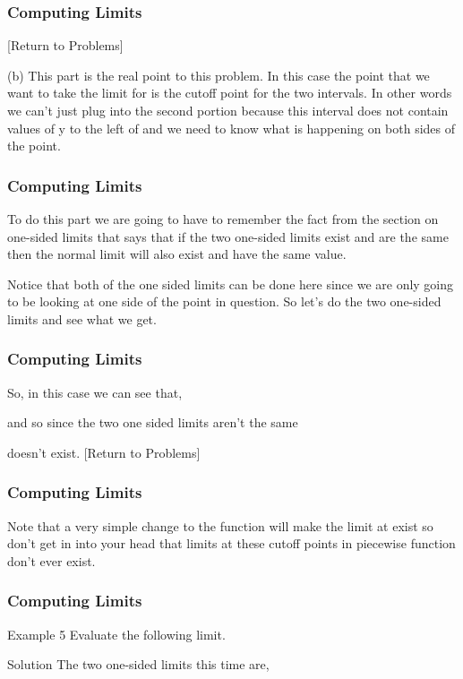 \documentclass{beamer}
\begin{document}
\begin{frame}[fragile]
	\frametitle{Computing Limits}
	\Large
[Return to Problems]

(b)  
This part is the real point to this problem.  In this case the point that we want to take the limit for is the cutoff point for the two intervals.  In other words we can’t just plug  into the second portion because this interval does not contain values of y to the left of  and we need to know what is happening on both sides of the point.
\end{frame}
\begin{frame}[fragile]
	\frametitle{Computing Limits}
	\Large
To do this part we are going to have to remember the fact from the section on one-sided limits that says that if the two one-sided limits exist and are the same then the normal limit will also exist and have the same value.

Notice that both of the one sided limits can be done here since we are only going to be looking at one side of the point in question.  So let’s do the two one-sided limits and see what we get.
\end{frame}
\begin{frame}[fragile]
	\frametitle{Computing Limits}
	\Large



So, in this case we can see that,

and so since the two one sided limits aren’t the same

doesn’t exist.
[Return to Problems]
\end{frame}
\begin{frame}[fragile]
	\frametitle{Computing Limits}
	\Large
Note that a very simple change to the function will make the limit at  exist so don’t get in into your head that limits at these cutoff points in piecewise function don’t ever exist.
\end{frame}
\begin{frame}[fragile]
	\frametitle{Computing Limits}
	\Large
Example 5  Evaluate the following limit.

Solution
The two one-sided limits this time are,



\end{frame}
\end{document}
